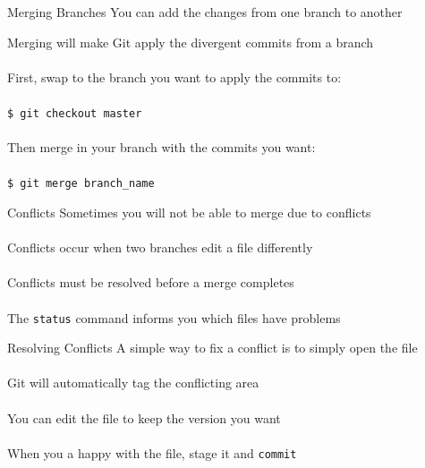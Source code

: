 \documentclass{beamer}
\begin{document}
\begin{frame}{Merging Branches}
    You can add the changes from one branch to another

    Merging will make Git apply the divergent commits from a branch \\~\\

    First, swap to the branch you want to apply the commits to: \\~\\

    {\tt \$ git checkout master} \\~\\

    Then merge in your branch with the commits you want: \\~\\

    {\tt \$ git merge branch\_name}
\end{frame}

\begin{frame}{Conflicts}
    Sometimes you will not be able to merge due to conflicts \\~\\

    Conflicts occur when two branches edit a file differently \\~\\

    Conflicts must be resolved before a merge completes \\~\\

    The {\tt status} command informs you which files have problems
\end{frame}

\begin{frame}{Resolving Conflicts}
    A simple way to fix a conflict is to simply open the file \\~\\

    Git will automatically tag the conflicting area \\~\\

    You can edit the file to keep the version you want \\~\\

    When you a happy with the file, stage it and {\tt commit}
\end{frame}
\end{document}
